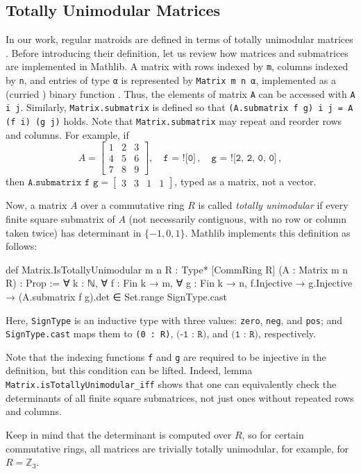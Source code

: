 \subsection{Totally Unimodular Matrices}

In our work, regular matroids are defined in terms of totally unimodular matrices \cite{Oxley2011,Truemper2016}. Before introducing their definition, let us review how matrices and submatrices are implemented in Mathlib. A matrix with rows indexed by \texttt{m}, columns indexed by \texttt{n}, and entries of type \texttt{α} is represented by \texttt{Matrix m n α}, implemented as a (curried \cite{Schonfinkel1924}) binary function . Thus, the elements of matrix \texttt{A} can be accessed with \texttt{A i j}. Similarly, \texttt{Matrix.submatrix} is defined so that \texttt{(A.submatrix f g) i j = A (f i) (g j)} holds. Note that \texttt{Matrix.submatrix} may repeat and reorder rows and columns. For example, if
\[
    A = \begin{bmatrix}
       1 & 2 & 3 \\
       4 & 5 & 6 \\
       7 & 8 & 9
    \end{bmatrix},
    \quad
    \texttt{f = ![0]}\,,
    \quad
    \texttt{g = ![2, 2, 0, 0]}\,,
\]
then
$
    \texttt{A.submatrix f g} =
    \begin{bmatrix}
       3 & 3 & 1 & 1
    \end{bmatrix}
$, typed as a matrix, not a vector.

Now, a matrix $A$ over a commutative ring $R$ is called \emph{totally unimodular} if every finite square submatrix of $A$ (not necessarily contiguous, with no row or column taken twice) has determinant in $\{-1, 0, 1\}$. Mathlib implements this definition as follows:
\begin{leancode}
def Matrix.IsTotallyUnimodular {m n R : Type*}
    [CommRing R] (A : Matrix m n R) :
    Prop :=
  ∀ k : ℕ, ∀ f : Fin k → m, ∀ g : Fin k → n,
    f.Injective → g.Injective →
      (A.submatrix f g).det ∈
        Set.range SignType.cast
\end{leancode}
Here, \texttt{SignType} is an inductive type with three values: \texttt{zero}, \texttt{neg}, and \texttt{pos}; and \texttt{SignType.cast} maps them to \texttt{(0 : R)}, $\texttt{(-1 : R)}$, and $\texttt{(1 : R)}$, respectively.

Note that the indexing functions \texttt{f} and \texttt{g} are required to be injective in the definition, but this condition can be lifted. Indeed, lemma \texttt{Matrix.isTotallyUnimodular\_iff} shows that one can equivalently check the determinants of all finite square submatrices, not just ones without repeated rows and columns.

Keep in mind that the determinant is computed over $R$, so for certain commutative rings, all matrices are trivially totally unimodular, for example, for $R = \mathbb{Z}_{3}$.
